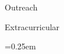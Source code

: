 \begin{small}
\begin{cvlist}{Outreach}
\end{cvlist}

\begin{cvlist}{Extracurricular}
\item
\begin{itemize}\itemsep=0.25em
\end{itemize}
\end{cvlist}


\setlength{\cvlabelwidth}{\oldcvlabelwidth}
\setlength{\cvlabelsep}{\oldcvlabelsep}
\end{small}
